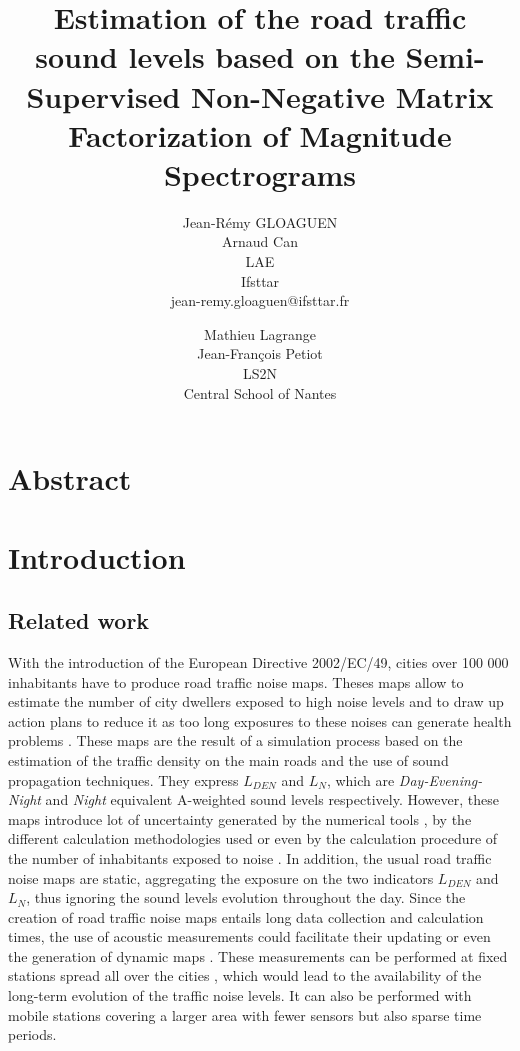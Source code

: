 \documentclass[twocolumn,a4paper,10pt]{article}
\title{Estimation of the road traffic sound levels based on the Semi-Supervised Non-Negative Matrix Factorization of Magnitude Spectrograms}
\author{
    Jean-Rémy GLOAGUEN\\
    Arnaud Can\\
    LAE\\
    Ifsttar\\
    jean-remy.gloaguen@ifsttar.fr
  \and
    Mathieu Lagrange\\
	Jean-François Petiot \\
    LS2N\\
    Central School of Nantes\\
}
\date{}
\newcommand{\ml}[1]{\textcolor{blue}{ Mathieu: #1}}
\begin{document}
\maketitle

\section*{Abstract}

\section{Introduction}
\subsection{Related work}
With the introduction of the European Directive 2002/EC/49, cities over 100 000 inhabitants have to produce road traffic noise maps. Theses maps allow to estimate the number of city dwellers exposed to high noise levels and to draw up action plans to reduce it as too long exposures to these noises can generate health problems \cite{who_burden_2017}. These maps are the result of a simulation process based on the estimation of the traffic density on the main roads and the use of sound propagation techniques. They express $L_ {DEN}$ and $L_N$, which are \textit{Day-Evening-Night} and \textit{Night} equivalent A-weighted sound levels respectively. However, these maps introduce lot of uncertainty generated by the numerical tools \cite{van_leeuwen_noise_2015}, by the different calculation methodologies used \cite{leroy_uncertainty_2010}\cite{garg_critical_2014} or even by the calculation procedure of the number of inhabitants exposed to noise \cite{king_implementation_2011}. In addition, the usual road traffic noise maps are static, aggregating the exposure on the two indicators $L_{DEN}$ and $L_N$, thus ignoring the sound levels evolution throughout the day. Since the creation of road traffic noise maps entails long data collection and calculation times, the use of acoustic measurements could facilitate their updating or even the generation of dynamic maps \cite{wei_dynamic_2016}. These measurements can be performed at fixed stations spread all over the cities \cite{Mioduszewski} \cite{mietlicki2012innovative}, which would lead to the availability of the long-term evolution of the traffic noise levels. It can also be performed with  mobile stations \cite{can_exploring_2012} \cite{manvell2004sadmam} covering a larger area with fewer sensors but also sparse time periods. %
\end{document}
